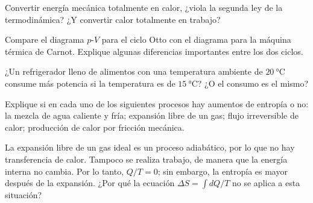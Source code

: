 %
\begin{center}
\end{center}
%
\begin{Exercise}
  Convertir energía mecánica totalmente en calor, ¿viola la segunda ley de la termodinámica? ¿Y convertir calor totalmente en trabajo?
\end{Exercise}
%
\begin{Exercise}
  {}{}
  Compare el diagrama $p$-$V$ para el ciclo Otto con el diagrama para la máquina térmica de Carnot. Explique algunas diferencias importantes entre los dos ciclos.
\end{Exercise}
%
\begin{Exercise}
  ¿Un refrigerador lleno de alimentos con una temperatura ambiente de $\SI{20}{\celsius}$ consume más potencia si la temperatura es de $\SI{15}{\celsius}$? ¿O el consumo es el mismo?
\end{Exercise}
%
\begin{Exercise}
  Explique si en cada uno de los siguientes procesos hay aumentos de entropía o no: la mezcla de agua caliente y fría; expansión libre de un gas; flujo irreversible de calor; producción de calor por fricción mecánica.
\end{Exercise}
%
\begin{Exercise}
  La expansión libre de un gas ideal es un proceso adiabático, por lo que no hay transferencia de calor. Tampoco se realiza trabajo, de manera que la energía interna no cambia. Por lo tanto, $Q/T = 0$; sin embargo, la entropía es mayor después de la expansión. ¿Por qué la ecuación $\Delta S = \int dQ/T$ no se aplica a esta situación?
\end{Exercise}
%
